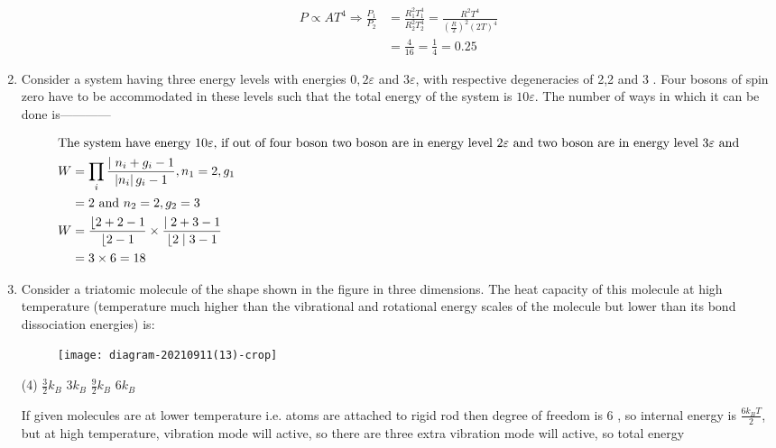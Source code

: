 \begin{enumerate}
\begin{answer}
\begin{align*}
P \propto A T^{4} \Rightarrow \frac{P_{1}}{P_{2}}&=\frac{R_{1}^{2} T_{1}^{4}}{R_{2}^{2} T_{2}^{4}}=\frac{R^{2} T^{4}}{\left(\frac{R}{2}\right)^{2}(2 T)^{4}}\\&=\frac{4}{16}=\frac{1}{4}=0.25
\end{align*}
\end{answer}
	\item Consider a system having three energy levels with energies $0,2 \varepsilon$ and $3 \varepsilon$, with respective degeneracies of 2,2 and 3 . Four bosons of spin zero have to be accommodated in these levels such that the total energy of the system is $10 \varepsilon$. The number of ways in which it can be done is------------
{}
\begin{answer}
\begin{align*}
\intertext{The system have energy $10 \varepsilon$, if out of four boson two boson are in energy level $2 \varepsilon$ and two boson are in energy level $3 \varepsilon$ and}W&=\prod_{i} \frac{\mid n_{i}+g_{i}-1}{\left|n_{i}\right| g_{i}-1}, n_{1}=2, g_{1}\\&=2\text{ and }n_{2}=2, g_{2}=3\\
W&=\frac{\lfloor 2+2-1}{\lfloor 2-1} \times \frac{\mid 2+3-1}{\lfloor 2 \mid 3-1}\\&=3 \times 6=18
\end{align*}
\end{answer}
\item Consider a triatomic molecule of the shape shown in the figure in three dimensions. The heat capacity of this molecule at high temperature (temperature much higher than the vibrational and rotational energy scales of the molecule but lower than its bond dissociation energies) is:
{}
\begin{figure}[H]
\centering
\texttt{[image: diagram-20210911(13)-crop]}
\end{figure}
\begin{tasks}(4)
\task[\textbf{A.}] $\frac{3}{2} k_{B}$
\task[\textbf{B.}] $3 k_{B}$
\task[\textbf{C.}] $\frac{9}{2} k_{B}$
\task[\textbf{D.}] $6 k_{B}$
\end{tasks}
\begin{answer}
If given molecules are at lower temperature i.e. atoms are attached to rigid rod then degree of freedom is 6 , so internal energy is $\frac{6 k_{B} T}{2}$, but at high temperature, vibration mode will active, so there are three extra vibration mode will active, so total energy

\end{answer}
\end{enumerate}
